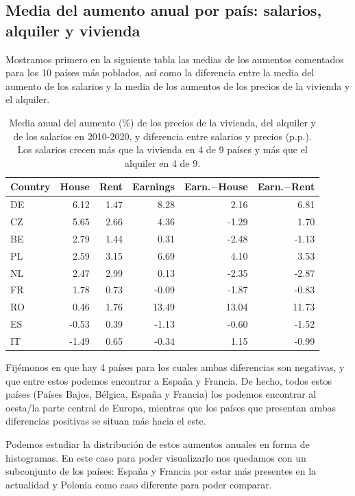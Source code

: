 \documentclass[water,article,submit,pdftex,moreauthors]{Definitions/mdpi}
\begin{document}
\subsection{Media del aumento anual por país: salarios, alquiler y
vivienda}\label{media-del-aumento-anual-por-pauxeds-salarios-alquiler-y-vivienda}

Mostramos primero en la siguiente tabla las medias de los aumentos
comentados para los 10 países más poblados, así como la diferencia entre
la media del aumento de los salarios y la media de los aumentos de los
precios de la vivienda y el alquiler.

\begin{table}[H]
\caption{Media anual del aumento (\%) de los precios de la vivienda, del alquiler y de los salarios en 2010-2020, y diferencia entre salarios y precios (p.p.). Los salarios crecen más que la vivienda en 4 de 9 países y más que el alquiler en 4 de 9.}
\centering\footnotesize

\begin{tabular}{lrrrrr}
\toprule
Country & House & Rent & Earnings & Earn.$-$House & Earn.$-$Rent\\
\midrule
DE & 6.12 & 1.47 & 8.28 & 2.16 & 6.81\\
CZ & 5.65 & 2.66 & 4.36 & -1.29 & 1.70\\
BE & 2.79 & 1.44 & 0.31 & -2.48 & -1.13\\
PL & 2.59 & 3.15 & 6.69 & 4.10 & 3.53\\
NL & 2.47 & 2.99 & 0.13 & -2.35 & -2.87\\
FR & 1.78 & 0.73 & -0.09 & -1.87 & -0.83\\
RO & 0.46 & 1.76 & 13.49 & 13.04 & 11.73\\
ES & -0.53 & 0.39 & -1.13 & -0.60 & -1.52\\
IT & -1.49 & 0.65 & -0.34 & 1.15 & -0.99\\
\bottomrule
\end{tabular}
\end{table}

Fijémonos en que hay 4 países para los cuales ambas diferencias son
negativas, y que entre estos podemos encontrar a España y Francia. De
hecho, todos estos países (Países Bajos, Bélgica, España y Francia) los
podemos encontrar al oesta/la parte central de Europa, mientras que los
países que presentan ambas diferencias positivas se situan más hacia el
este.

Podemos estudiar la distribución de estos aumentos anuales en forma de
histogramas. En este caso para poder visualizarlo nos quedamos con un
subconjunto de los países: España y Francia por estar más presentes en
la actualidad y Polonia como caso diferente para poder comparar.
\end{document}
